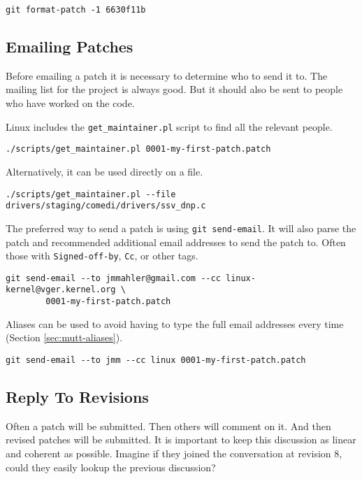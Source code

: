 \documentclass{article}
\begin{document}
\begin{verbatim}
git format-patch -1 6630f11b
\end{verbatim}

\subsection{Emailing Patches}

Before emailing a patch it is necessary to determine who to send it to.
The mailing list for the project is always good.
But it should also be sent to people who have worked on the code.

Linux includes the \verb+get_maintainer.pl+ script to find all the relevant
people.

\begin{verbatim}
./scripts/get_maintainer.pl 0001-my-first-patch.patch
\end{verbatim}

Alternatively, it can be used directly on a file.

\begin{verbatim}
./scripts/get_maintainer.pl --file drivers/staging/comedi/drivers/ssv_dnp.c
\end{verbatim}

The preferred way to send a patch is using \verb+git send-email+.
It will also parse the patch and recommended additional email addresses
to send the patch to.  Often those with \verb+Signed-off-by+, \verb+Cc+, or other tags.

\begin{verbatim}
git send-email --to jmmahler@gmail.com --cc linux-kernel@vger.kernel.org \
        0001-my-first-patch.patch
\end{verbatim}

Aliases can be used to avoid having to type the full email addresses
every time (Section \ref{sec:mutt-aliases}).

\begin{verbatim}
git send-email --to jmm --cc linux 0001-my-first-patch.patch
\end{verbatim}

\subsection{Reply To Revisions}

Often a patch will be submitted.  Then others will comment on it.
And then revised patches will be submitted.  It is important to keep
this discussion as linear and coherent as possible.  Imagine if they
joined the conversation at revision 8, could they easily lookup the
previous discussion?
\end{document}
